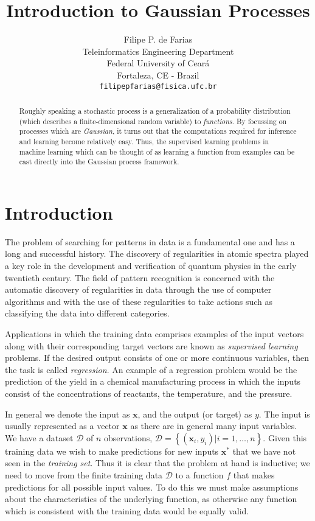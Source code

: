 \documentclass{article} %
\title{Introduction to Gaussian Processes}
\author{
Filipe P. de Farias
\\
Teleinformatics Engineering Department\\
Federal University of Ceará\\
Fortaleza, CE - Brazil\\
\texttt{filipepfarias@fisica.ufc.br} \\
}
\begin{document}
\maketitle

\begin{abstract}
   Roughly speaking a stochastic process is a generalization of a probability distribution (which describes a finite-dimensional random variable) to \textit{functions}. By focussing on processes which are \textit{Gaussian}, it turns out that the computations required for inference and learning become relatively easy. Thus, the supervised learning problems in machine learning which can be thought of as learning a function from examples can be cast directly into the Gaussian process framework.\cite{rasmussen2006gaussian}
\end{abstract}

\section{Introduction}

The problem of searching for patterns in data is a fundamental one and has a long and successful history. The discovery of regularities in atomic spectra played a key role in the development and verification of quantum physics in the early twentieth century. The field of pattern recognition is concerned with the automatic discovery of regularities in data through the use of computer algorithms and with the use of these regularities to take actions such as classifying the data into different categories.

Applications in which the training data comprises examples of the input vectors along with their corresponding target vectors are known as \textit{supervised learning} problems. If the desired output consists of one or more continuous variables, then the task is called \textit{regression}. An example of a regression problem would be the prediction of the yield in a chemical manufacturing process in which the inputs consist of the concentrations of reactants, the temperature, and the pressure.\cite{bishop2006pattern}

In general we denote the input as $\mathbf{x}$, and the output (or target) as $y$. The input is usually represented as a vector $\mathbf{x}$ as there are in general many input variables. We have a dataset $\mathcal{D}$ of $n$ observations, $\mathcal{D}=\left\{\left(\mathbf{x}_{i}, y_{i}\right) | i=1, \ldots, n\right\}$. Given this training data we wish to make predictions for new inputs $\mathbf{x^*}$ that we have not seen in the \textit{training set}. Thus it is clear that the problem at hand is inductive; we need to move from the finite training data $\mathcal{D}$ to a function $f$ that makes predictions for all possible input values. To do this we must make assumptions about the characteristics of the underlying function, as otherwise any function which is consistent with the training data would be equally valid.
\end{document}
